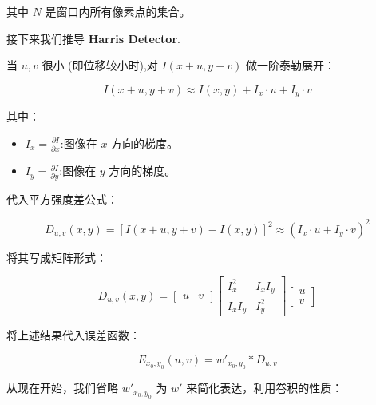 其中 $N$ 是窗口内所有像素点的集合。

\vspace{1em}

接下来我们推导 \textbf{Harris Detector}.

当 $u, v$ 很小 (即位移较小时),对 $I(x + u, y + v)$ 做一阶泰勒展开：

\begin{equation}
    I(x + u, y + v) \approx I(x, y) + I_x \cdot u + I_y \cdot v
\end{equation}

其中：
\begin{itemize}
    \item $I_x = \frac{\partial I}{\partial x}$:图像在 $x$ 方向的梯度。
    \item $I_y = \frac{\partial I}{\partial y}$:图像在 $y$ 方向的梯度。
\end{itemize}

代入平方强度差公式：

\begin{equation}
    D_{u,v}(x, y) = \left[I(x + u, y + v) - I(x, y)\right]^2
    \approx \left(I_x \cdot u + I_y \cdot v\right)^2
\end{equation}

将其写成矩阵形式：

\begin{equation}
    D_{u,v}(x, y) =
    \begin{bmatrix}
        u & v
    \end{bmatrix}
    \begin{bmatrix}
        I_x^2 & I_x I_y \\
        I_x I_y & I_y^2
    \end{bmatrix}
    \begin{bmatrix}
        u \\
        v
    \end{bmatrix}
\end{equation}

将上述结果代入误差函数：

\begin{equation}
    E_{x_0, y_0}(u, v) = w'_{x_0, y_0} * D_{u,v}
\end{equation}

从现在开始，我们省略 $w'_{x_0, y_0}$ 为 $w'$ 来简化表达，利用卷积的性质：

